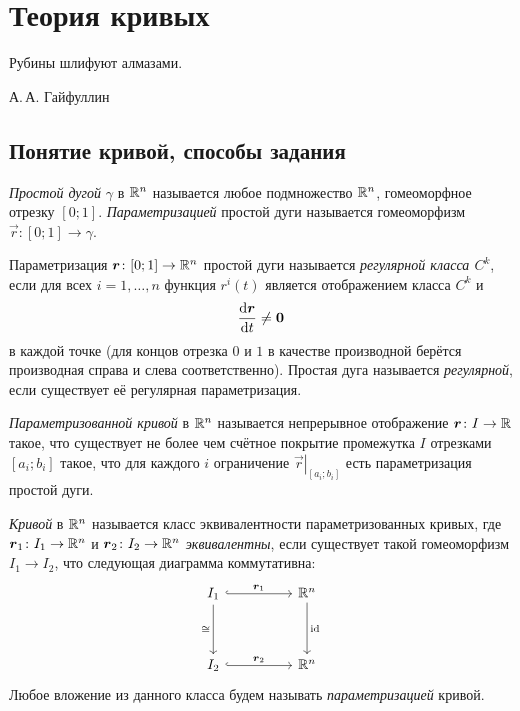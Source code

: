 \section{Теория кривых}

\epigraph{Рубины шлифуют алмазами.}{А.\,А. Гайфуллин}

\subsection{Понятие кривой, способы задания}

\begin{definition}
	\textit{Простой дугой} $\gamma$ в $\mathbb{R}^n$ называется любое подмножество $\mathbb{R}^n$, гомеоморфное отрезку $[0; 1]$. \textit{Параметризацией} простой дуги называется гомеоморфизм $\vec{r}\colon [0; 1] \to \gamma$.
\end{definition}

\begin{definition}
	Параметризация $\boldsymbol{r}\colon [0; 1] \to \mathbb{R}^n$ простой дуги называется \textit{регулярной класса $C^k$}, если для всех $i = 1, \ldots, n$ функция $r^i(t)$ является отображением класса $C^k$ и
	\[
		\frac{\mathop{}\!\mathrm{d}\boldsymbol{r}}{\mathop{}\!\mathrm{d} t} \ne \boldsymbol{0}
	\]
	в каждой точке (для концов отрезка $0$ и $1$ в качестве производной берётся производная справа и слева соответственно). Простая дуга называется \textit{регулярной}, если существует её регулярная параметризация.
\end{definition}

\begin{definition}
	\textit{Параметризованной кривой} в $\mathbb{R}^n$ называется непрерывное отображение $\boldsymbol{r}\colon I \to \mathbb{R}$ такое, что существует не более чем счётное покрытие промежутка $I$ отрезками $[a_i; b_i]$ такое, что для каждого $i$ ограничение $\left.\vec{r}\right|_{[a_i; b_i]}$ есть параметризация простой дуги.
\end{definition}

\begin{definition}
	\textit{Кривой} в $\mathbb{R}^n$ называется класс эквивалентности параметризованных кривых, где $\boldsymbol{r}_1\colon I_1 \to \mathbb{R}^n$ и $\boldsymbol{r}_2\colon I_2 \to \mathbb{R}^n$ \textit{эквивалентны}, если существует такой гомеоморфизм $I_1 \to I_2$, что следующая диаграмма коммутативна:
	\begin{equation*}
		\begin{tikzcd}
			I_1 && {\R^n} \\
			\\
			I_2 && {\R^n}
			\arrow["\vec{r}_1", hook, from=1-1, to=1-3]
			\arrow["\cong"', from=1-1, to=3-1]
			\arrow["\id", from=1-3, to=3-3]
			\arrow["\vec{r}_2", hook, from=3-1, to=3-3]
		\end{tikzcd}
	\end{equation*}
	Любое вложение из данного класса будем называть \textit{параметризацией} кривой.
\end{definition}

